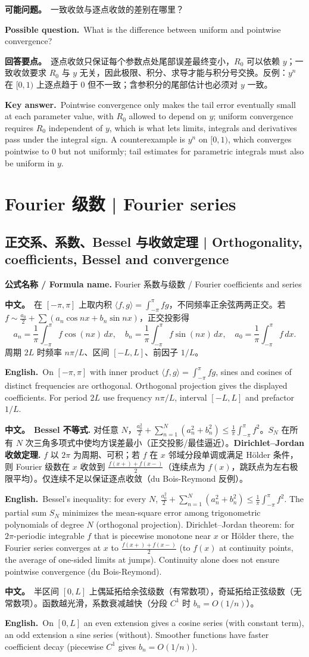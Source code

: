 \documentclass[UTF8,11pt,a4paper]{ctexart}
\newcommand{\BOTH}[2]{\par\noindent\textbf{中文。}\ #1\par\noindent\textbf{English.}\ #2\par}
\newcommand{\FORMULA}[2]{\par\noindent\textbf{公式名称 / Formula name.} #1 / #2\par}
\newcommand{\ASK}[4]{\begin{samepage}\par\noindent\textbf{可能问题。}\ #1\par\noindent\textbf{Possible question.}\ #2\par\noindent\textbf{回答要点。}\ #3\par\noindent\textbf{Key answer.}\ #4\medskip\end{samepage}}
\begin{document}
\ASK{一致收敛与逐点收敛的差别在哪里？}{What is the difference between uniform and pointwise convergence?}{逐点收敛只保证每个参数点处尾部误差最终变小，$R_0$ 可以依赖 $y$；一致收敛要求 $R_0$ 与 $y$ 无关，因此极限、积分、求导才能与积分号交换。反例：$y^n$ 在 $[0,1)$ 上逐点趋于 $0$ 但不一致；含参积分的尾部估计也必须对 $y$ 一致。}{Pointwise convergence only makes the tail error eventually small at each parameter value, with $R_0$ allowed to depend on $y$; uniform convergence requires $R_0$ independent of $y$, which is what lets limits, integrals and derivatives pass under the integral sign. A counterexample is $y^n$ on $[0,1)$, which converges pointwise to $0$ but not uniformly; tail estimates for parametric integrals must also be uniform in $y$.}

\section{Fourier 级数 | Fourier series}

\subsection{正交系、系数、Bessel 与收敛定理 | Orthogonality, coefficients, Bessel and convergence}
\FORMULA{Fourier 系数与级数}{Fourier coefficients and series}
\BOTH{在 $[-\pi,\pi]$ 上取内积 $\langle f,g\rangle=\int_{-\pi}^{\pi}fg$，不同频率正余弦两两正交。若 $f\sim\frac{a_0}{2}+\sum(a_n\cos nx+b_n\sin nx)$，正交投影得
\[
a_n=\frac1\pi\int_{-\pi}^{\pi}f\cos(nx)\,dx,\quad
b_n=\frac1\pi\int_{-\pi}^{\pi}f\sin(nx)\,dx,\quad
a_0=\frac1\pi\int_{-\pi}^{\pi}f\,dx .
\]
周期 $2L$ 时频率 $n\pi/L$、区间 $[-L,L]$、前因子 $1/L$。}{On $[-\pi,\pi]$ with inner product $\langle f,g\rangle=\int_{-\pi}^{\pi}fg$, sines and cosines of distinct frequencies are orthogonal. Orthogonal projection gives the displayed coefficients. For period $2L$ use frequency $n\pi/L$, interval $[-L,L]$ and prefactor $1/L$.}
\BOTH{\textbf{Bessel 不等式.} 对任意 $N$，$\frac{a_0^2}{2}+\sum_{n=1}^{N}(a_n^2+b_n^2)\le\frac1\pi\int_{-\pi}^{\pi}f^2$。$S_N$ 在所有 $N$ 次三角多项式中使均方误差最小（正交投影/最佳逼近）。\textbf{Dirichlet--Jordan 收敛定理.} $f$ 以 $2\pi$ 为周期、可积；若 $f$ 在 $x$ 邻域分段单调或满足 Hölder 条件，则 Fourier 级数在 $x$ 收敛到 $\frac{f(x+)+f(x-)}{2}$（连续点为 $f(x)$，跳跃点为左右极限平均）。仅连续不足以保证逐点收敛（du Bois-Reymond 反例）。}{Bessel's inequality: for every $N$, $\frac{a_0^2}{2}+\sum_{n=1}^{N}(a_n^2+b_n^2)\le\frac1\pi\int_{-\pi}^{\pi}f^2$. The partial sum $S_N$ minimizes the mean-square error among trigonometric polynomials of degree $N$ (orthogonal projection). Dirichlet--Jordan theorem: for $2\pi$-periodic integrable $f$ that is piecewise monotone near $x$ or Hölder there, the Fourier series converges at $x$ to $\frac{f(x+)+f(x-)}{2}$ (to $f(x)$ at continuity points, the average of one-sided limits at jumps). Continuity alone does not ensure pointwise convergence (du Bois-Reymond).}
\BOTH{半区间 $[0,L]$ 上偶延拓给余弦级数（有常数项），奇延拓给正弦级数（无常数项）。函数越光滑，系数衰减越快（分段 $C^1$ 时 $b_n=O(1/n)$）。}{On $[0,L]$ an even extension gives a cosine series (with constant term), an odd extension a sine series (without). Smoother functions have faster coefficient decay (piecewise $C^1$ gives $b_n=O(1/n)$).}
\end{document}
